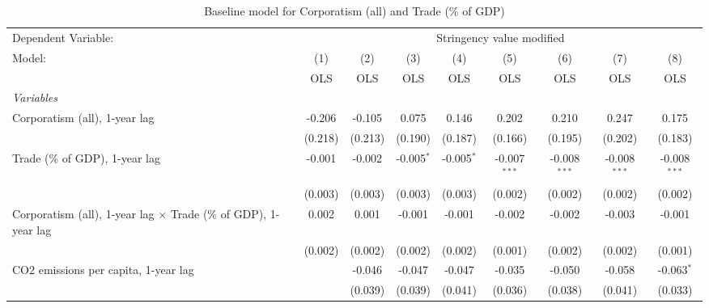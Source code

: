 
\begin{table}[htbp]
   \caption{Baseline model for Corporatism (all) and Trade (\% of GDP)}
   \centering
   \begin{tabular}{lcccccccc}
      \toprule
      Dependent Variable: & \multicolumn{8}{c}{Stringency value modified}\\
      Model:                                                                 & (1)     & (2)     & (3)           & (4)           & (5)            & (6)            & (7)            & (8)\\  
                                                                             &  OLS    & OLS     & OLS           & OLS           & OLS            & OLS            & OLS            & OLS\\  
      \midrule
      \emph{Variables}\\
      Corporatism (all), 1-year lag                                          & -0.206  & -0.105  & 0.075         & 0.146         & 0.202          & 0.210          & 0.247          & 0.175\\   
                                                                             & (0.218) & (0.213) & (0.190)       & (0.187)       & (0.166)        & (0.195)        & (0.202)        & (0.183)\\   
      Trade (\% of GDP), 1-year lag                                          & -0.001  & -0.002  & -0.005$^{*}$  & -0.005$^{*}$  & -0.007$^{***}$ & -0.008$^{***}$ & -0.008$^{***}$ & -0.008$^{***}$\\   
                                                                             & (0.003) & (0.003) & (0.003)       & (0.003)       & (0.002)        & (0.002)        & (0.002)        & (0.002)\\   
      Corporatism (all), 1-year lag $\times$ Trade (\% of GDP), 1-year lag   & 0.002   & 0.001   & -0.001        & -0.001        & -0.002         & -0.002         & -0.003         & -0.001\\   
                                                                             & (0.002) & (0.002) & (0.002)       & (0.002)       & (0.001)        & (0.002)        & (0.002)        & (0.001)\\   
      CO2 emissions per capita, 1-year lag                                   &         & -0.046  & -0.047        & -0.047        & -0.035         & -0.050         & -0.058         & -0.063$^{*}$\\   
                                                                             &         & (0.039) & (0.039)       & (0.041)       & (0.036)        & (0.038)        & (0.041)        & (0.033)\\   

\end{tabular}
\end{table}
